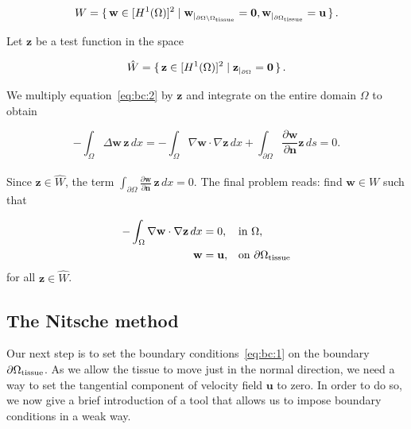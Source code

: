 \documentclass[11pt,a4paper,titlepage]{report}
\begin{document}
\begin{equation}
W = \set{\mathbf{w} \in [H^1(\Omega)]^2 | \mathbf{w}_{|_{\partial \Omega \setminus \Omega_{\rm tissue}}} = \mathbf{0}, \mathbf{w}_{|_{\partial \Omega_{\rm tissue} } }  = \mathbf{u} }.
\end{equation}

Let $\mathbf{z}$ be a test function in the space

\begin{equation}
\hat{W} = \set{\mathbf{z} \in [H^1(\Omega)]^2 | \mathbf{z}_{|_{\partial \Omega}} = \mathbf{0}}.
\end{equation}



We multiply equation~\eqref{eq:bc:2} by $\mathbf{z}$ and integrate on the entire domain $\Omega$ to obtain

\begin{equation}
\label{eq:bc:4}
- \int_{\Omega} \Delta \mathbf{w} \, \mathbf{z} \, dx
= - \int_{\Omega} \nabla \mathbf{w} \cdot \nabla \mathbf{z} \, dx
+ \int_{\partial \Omega} \frac{\partial \mathbf{w}}{\partial \mathbf{n}} \mathbf{z} \, ds = 0.
\end{equation}
\\
Since $\mathbf{z} \in \hat{W}$, the term $\int_{\partial \Omega} \frac{\partial \mathbf{w}}{\partial \mathbf{n}} \, \mathbf{z} \, dx  = 0$. The final problem reads: find $\mathbf{w} \in W$ such that

\begin{align}
-  \int_{\Omega} \nabla \mathbf{w} \cdot \nabla \mathbf{z} \, dx &= 0, && \text{in } \Omega, \\
 \mathbf{w} &= \mathbf{u}, && \text{on } \partial \Omega_{\rm tissue}
\end{align}
for all $ \mathbf{z} \in \hat{W}$.


\subsection{The Nitsche method}
Our next step is to set the boundary conditions~\eqref{eq:bc:1} on the boundary $\partial \Omega_{\rm tissue}$. As we allow the tissue to move just in the normal direction, we need a way to set the tangential component of velocity field $\mathbf{u}$ to zero. In order to do so, we now give a brief introduction of a tool that allows us to impose boundary conditions in a weak way.
\end{document}
